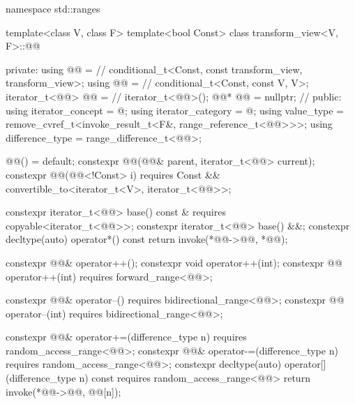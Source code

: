 %
\begin{codeblock}
namespace std::ranges {
  template<class V, class F>
  template<bool Const>
  class transform_view<V, F>::@@ {
  private:
    using @@ =                              // \expos
      conditional_t<Const, const transform_view, transform_view>;
    using @@   =                              // \expos
      conditional_t<Const, const V, V>;
    iterator_t<@@> @@ =                 // \expos
      iterator_t<@@>();
    @@* @@ = nullptr;                  // \expos
  public:
    using iterator_concept  = @\seebelow@;
    using iterator_category = @\seebelow@;
    using value_type        =
      remove_cvref_t<invoke_result_t<F&, range_reference_t<@@>>>;
    using difference_type   = range_difference_t<@@>;

    @@() = default;
    constexpr @@(@@& parent, iterator_t<@@> current);
    constexpr @@(@@<!Const> i)
      requires Const && convertible_to<iterator_t<V>, iterator_t<@@>>;

    constexpr iterator_t<@@> base() const &
      requires copyable<iterator_t<@@>>;
    constexpr iterator_t<@@> base() &&;
    constexpr decltype(auto) operator*() const
    { return invoke(*@@->@@, *@@); }

    constexpr @@& operator++();
    constexpr void operator++(int);
    constexpr @@ operator++(int) requires forward_range<@@>;

    constexpr @@& operator--() requires bidirectional_range<@@>;
    constexpr @@ operator--(int) requires bidirectional_range<@@>;

    constexpr @@& operator+=(difference_type n)
      requires random_access_range<@@>;
    constexpr @@& operator-=(difference_type n)
      requires random_access_range<@@>;
    constexpr decltype(auto) operator[](difference_type n) const
      requires random_access_range<@@>
    { return invoke(*@@->@@, @@[n]); }

}}
\end{codeblock}

